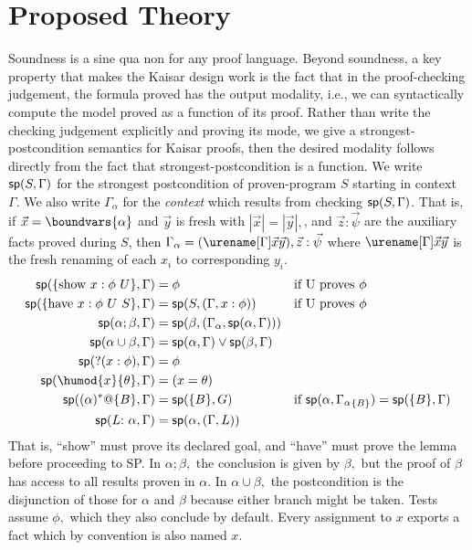 \documentclass[12pt]{cmuthesis}
\theoremstyle{definition}
\theoremstyle{remark}
\newcommand{\G}{\Gamma}
\begin{document}
\section{Proposed Theory}
Soundness is a sine qua non for any proof language.
Beyond soundness, a key property that makes the Kaisar design work is the fact that in the proof-checking judgement, the formula proved has the output modality, i.e., we can syntactically compute the model proved as a function of its proof.
Rather than write the checking judgement explicitly and proving its mode, we give a strongest-postcondition semantics for Kaisar proofs, then the desired modality follows directly from the fact that strongest-postcondition is a function.
We write $\spost{S}{\G}$ for the strongest postcondition of proven-program $S$ starting in context $\G$.
We also write $\G_\alpha$ for the \emph{context} which results from checking $\spost{S}{\G}$.
That is, if $\vec{x} = \boundvars{\alpha}$ and $\vec{y}$ is fresh with $|\vec{x}| = |\vec{y}|,$, and $\vec{z}:\vec{\psi}$ are the auxiliary facts proved during $S$,
then $\G_\alpha = (\eren{\G}{\vec{x}}{\vec{y}}),\vec{z}:\vec{\psi}$ where $\eren{\G}{\vec{x}}{\vec{y}}$ is the fresh renaming of each $x_i$ to corresponding $y_i$.
\begin{align*}
\spost{\{\sshow{x}{\phi}{U}\}}{\G}             &= \phi                                        &&\text{if U proves }\phi\\
\spost{\{\shave{x}{\phi}{U}{S}\}}{\G}          &= \spost{S}{(\G,x:\phi)}                      &&\text{if U proves }\phi\\
\spost{\alpha;\beta}{\G}                       &= \spost{\beta}{(\G_\alpha,\spost{\alpha}{\G})} &&\\
\spost{\alpha\cup\beta}{\G}                    &= \spost{\alpha}{\G} \vee \spost{\beta}{\G}   &&\\
\spost{?(x:\phi)}{\G} &= \phi &&\\
\spost{\humod{x}{\theta}}{\G} &=(x=\theta) &&\\
  \spost{(\alpha)^*@\{B\}}{\G} &= \spost{\{B\}}{G} &&\text{if }\spost{\alpha}{{\G_\alpha}_{\{B\}}}=\spost{\{B\}}{\G}\\
\spost{L{:}\ \alpha}{\G} &= \spost{\alpha}{(\G,L)} 
\end{align*}
That is, ``show'' must prove its declared goal, and ``have'' must prove the lemma before proceeding to SP.
In $\alpha;\beta,$ the conclusion is given by $\beta,$ but the proof of $\beta$ has access to all results proven in $\alpha$.
In $\alpha\cup\beta,$ the postcondition is the disjunction of those for $\alpha$ and $\beta$ because either branch might be taken.
Tests assume $\phi,$ which they also conclude by default.
Every assignment to $x$ exports a fact which by convention is also named $x$.
\end{document}
